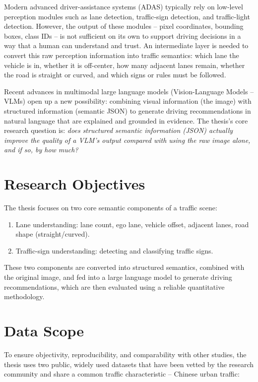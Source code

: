 \documentclass[12pt,a4paper]{report}
\begin{document}
Modern advanced driver-assistance systems (ADAS) typically rely on low-level perception modules such as lane detection, traffic-sign detection, and traffic-light detection. However, the output of these modules -- pixel coordinates, bounding boxes, class IDs -- is not sufficient on its own to support driving decisions in a way that a human can understand and trust. An intermediate layer is needed to convert this raw perception information into traffic semantics: which lane the vehicle is in, whether it is off-center, how many adjacent lanes remain, whether the road is straight or curved, and which signs or rules must be followed.

Recent advances in multimodal large language models (Vision-Language Models -- VLMs) open up a new possibility: combining visual information (the image) with structured information (semantic JSON) to generate driving recommendations in natural language that are explained and grounded in evidence. The thesis's core research question is: \textit{does structured semantic information (JSON) actually improve the quality of a VLM's output compared with using the raw image alone, and if so, by how much?}

\section{Research Objectives}

The thesis focuses on two core semantic components of a traffic scene:

\begin{enumerate}
    \item Lane understanding: lane count, ego lane, vehicle offset, adjacent lanes, road shape (straight/curved).
    \item Traffic-sign understanding: detecting and classifying traffic signs.
\end{enumerate}

These two components are converted into structured semantics, combined with the original image, and fed into a large language model to generate driving recommendations, which are then evaluated using a reliable quantitative methodology.

\section{Data Scope}

To ensure objectivity, reproducibility, and comparability with other studies, the thesis uses two public, widely used datasets that have been vetted by the research community and share a common traffic characteristic -- Chinese urban traffic:
\end{document}
